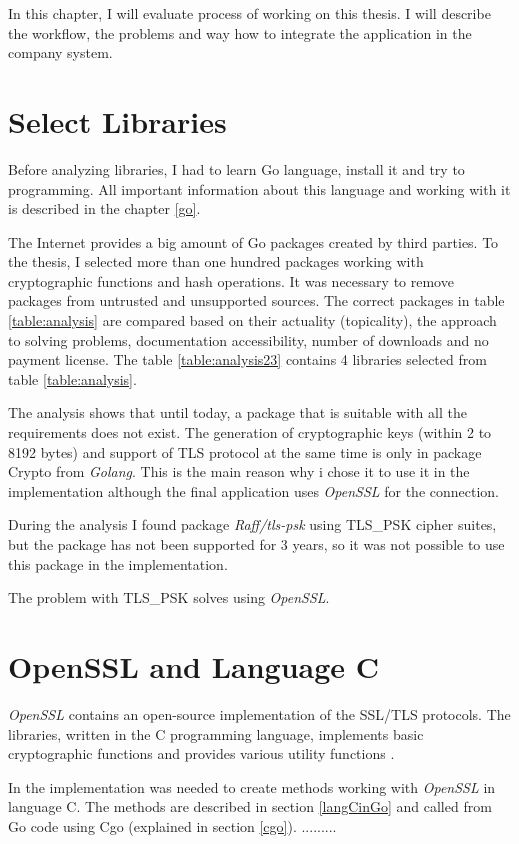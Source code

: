 \documentclass[
  digital, %
  notable,   %
  lof,     %
  lot,     %
]{fithesis3}
\begin{document}
In this chapter, I will evaluate process of working on this thesis. I will describe the workflow, 
the problems and way how to integrate the application in the company system.

\section{Select Libraries}
Before analyzing libraries, I had to learn Go language, install it and try to programming. All 
important information about this language and working with it is described in the chapter 
\ref{go}. 

The Internet provides a big amount of Go packages created by third parties. To the thesis, I 
selected more than one hundred packages working with cryptographic functions and hash operations. 
It was necessary to remove packages from untrusted and unsupported sources. The correct packages 
in table \ref{table:analysis} are compared based on their actuality (topicality), the approach to 
solving problems, documentation accessibility, number of downloads and no payment license. The 
table \ref{table:analysis23} contains 4 libraries selected from table \ref{table:analysis}. 

The analysis shows that until today, a package that is suitable with all the requirements does not 
exist. The generation of cryptographic keys (within 2 to 8192 bytes) and support of TLS protocol at 
the same time is only in package Crypto from \textit{Golang}. This is the main reason why i chose it to use it in the implementation although the final application uses \textit{OpenSSL} for the connection.

During the analysis I found package \textit{Raff/tls-psk} using TLS\_PSK cipher suites, but the 
package has not been supported for 3 years, so it was not possible to use this package in the 
implementation. 

The problem with TLS\_PSK solves using \textit{OpenSSL}.

\section{OpenSSL and Language C}

\textit{OpenSSL} contains an open-source implementation of the SSL/TLS protocols. The libraries, 
written in the C programming language, implements basic cryptographic functions and provides 
various utility functions \cite{foundation}. 

In the implementation was needed to create methods working with \textit{OpenSSL} in language C. 
The methods are described in section \ref{langCinGo} and called from Go code using Cgo (explained 
in section \ref{cgo}). .........
\end{document}
